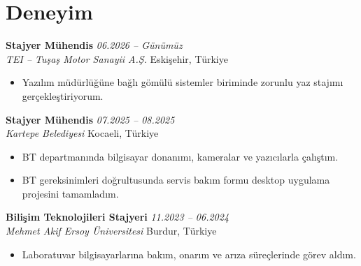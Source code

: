 \section{Deneyim}

\textbf{Stajyer Mühendis} \hfill \textit{06.2026 -- Günümüz} \\
\textit{TEI -- Tuşaş Motor Sanayii A.Ş.} \hfill Eskişehir, Türkiye
\begin{itemize}[leftmargin=1.5em, itemsep=0pt, topsep=2pt]
  \item Yazılım müdürlüğüne bağlı gömülü sistemler biriminde zorunlu yaz stajımı gerçekleştiriyorum.
\end{itemize}

\vspace{0.4em}

\textbf{Stajyer Mühendis} \hfill \textit{07.2025 -- 08.2025} \\
\textit{Kartepe Belediyesi} \hfill Kocaeli, Türkiye
\begin{itemize}[leftmargin=1.5em, itemsep=0pt, topsep=2pt]
  \item BT departmanında bilgisayar donanımı, kameralar ve yazıcılarla çalıştım.
  \item BT gereksinimleri doğrultusunda servis bakım formu desktop uygulama projesini tamamladım.
\end{itemize}

\vspace{0.4em}

\textbf{Bilişim Teknolojileri Stajyeri} \hfill \textit{11.2023 -- 06.2024} \\
\textit{Mehmet Akif Ersoy Üniversitesi} \hfill Burdur, Türkiye
\begin{itemize}[leftmargin=1.5em, itemsep=0pt, topsep=2pt]
  \item Laboratuvar bilgisayarlarına bakım, onarım ve arıza süreçlerinde görev aldım.
\end{itemize}
